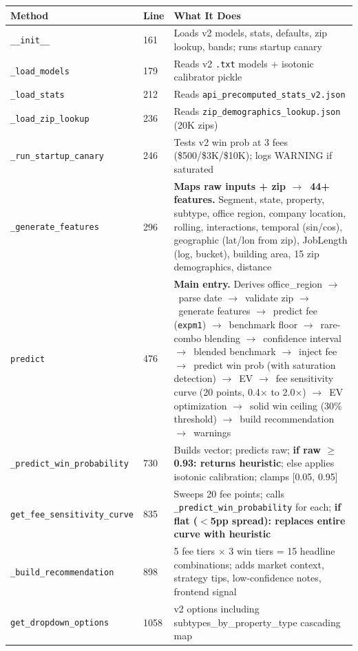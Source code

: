 \documentclass[11pt,a4paper]{article}
\newcommand{\file}[1]{\texttt{\color{gssblue!70!black}#1}}
\newcommand{\func}[1]{\texttt{\color{gssgreen!80!black}#1}}
\newcommand{\arrow}{$\rightarrow$}
\begin{document}
\begin{longtable}{l l p{7.5cm}}
\toprule
\textbf{Method} & \textbf{Line} & \textbf{What It Does} \\
\midrule
\endhead
\func{\_\_init\_\_} & 161 & Loads v2 models, stats, defaults, zip lookup, bands; runs startup canary \\
\func{\_load\_models} & 179 & Reads v2 \texttt{.txt} models + isotonic calibrator pickle \\
\func{\_load\_stats} & 212 & Reads \file{api\_precomputed\_stats\_v2.json} \\
\func{\_load\_zip\_lookup} & 236 & Reads \file{zip\_demographics\_lookup.json} (20K zips) \\
\func{\_run\_startup\_canary} & 246 & Tests v2 win prob at 3 fees (\$500/\$3K/\$10K); logs WARNING if saturated \\
\func{\_generate\_features} & 296 & \textbf{Maps raw inputs + zip \arrow\ 44+ features.} Segment, state, property, subtype, office region, company location, rolling, interactions, temporal (sin/cos), geographic (lat/lon from zip), JobLength (log, bucket), building area, 15 zip demographics, distance \\
\func{predict} & 476 & \textbf{Main entry.} Derives office\_region \arrow\ parse date \arrow\ validate zip \arrow\ generate features \arrow\ predict fee (\texttt{expm1}) \arrow\ benchmark floor \arrow\ rare-combo blending \arrow\ confidence interval \arrow\ blended benchmark \arrow\ inject fee \arrow\ predict win prob (with saturation detection) \arrow\ EV \arrow\ fee sensitivity curve (20 points, 0.4$\times$ to 2.0$\times$) \arrow\ EV optimization \arrow\ solid win ceiling (30\% threshold) \arrow\ build recommendation \arrow\ warnings \\
\func{\_predict\_win\_probability} & 730 & Builds vector; predicts raw; \textbf{if raw $\geq$ 0.93: returns heuristic}; else applies isotonic calibration; clamps [0.05, 0.95] \\
\func{get\_fee\_sensitivity\_curve} & 835 & Sweeps 20 fee points; calls \func{\_predict\_win\_probability} for each; \textbf{if flat ($<$5pp spread): replaces entire curve with heuristic} \\
\func{\_build\_recommendation} & 898 & 5 fee tiers $\times$ 3 win tiers = 15 headline combinations; adds market context, strategy tips, low-confidence notes, frontend signal \\
\func{get\_dropdown\_options} & 1058 & v2 options including subtypes\_by\_property\_type cascading map \\
\bottomrule
\end{longtable}
\end{document}
